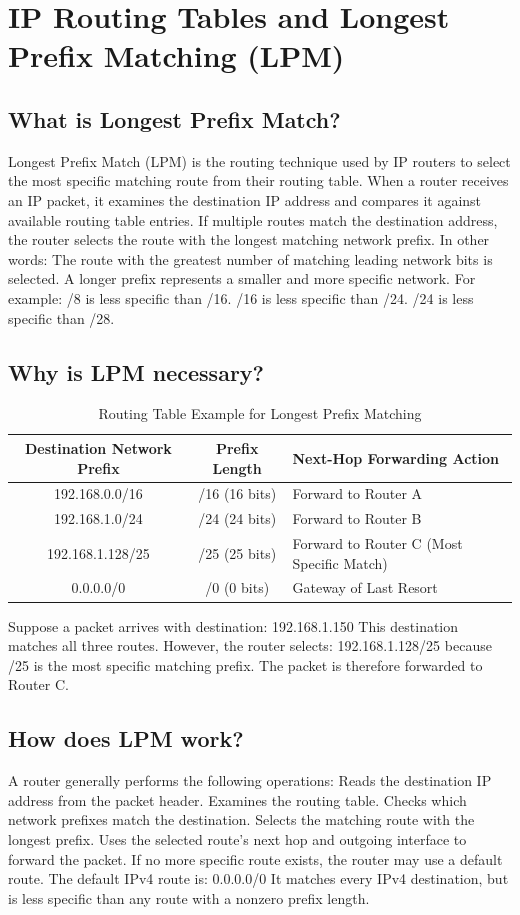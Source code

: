 \section{IP Routing Tables and Longest Prefix Matching (LPM)}

\subsection{What is Longest Prefix Match?}
Longest Prefix Match (LPM) is the routing technique used by IP routers to select the most specific matching route from their routing table.
When a router receives an IP packet, it examines the destination IP address and compares it against available routing table entries.
If multiple routes match the destination address, the router selects the route with the longest matching network prefix.
In other words:
The route with the greatest number of matching leading network bits is selected.
A longer prefix represents a smaller and more specific network.
For example:
/8 is less specific than /16.
/16 is less specific than /24.
/24 is less specific than /28.
\subsection{Why is LPM necessary?}
\begin{table}[htbp]
\centering
\caption{Routing Table Example for Longest Prefix Matching}
\label{tab:lpm_routing_sample}
\begin{tabularx}{0.85\textwidth}{ccX}
\toprule
\textbf{Destination Network Prefix} & \textbf{Prefix Length} & \textbf{Next-Hop Forwarding Action} \\
\midrule
192.168.0.0/16 & /16 (16 bits) & Forward to Router A \\
192.168.1.0/24 & /24 (24 bits) & Forward to Router B \\
192.168.1.128/25 & /25 (25 bits) & Forward to Router C (Most Specific Match) \\
0.0.0.0/0 & /0 (0 bits) & Gateway of Last Resort \\
\bottomrule
\end{tabularx}
\end{table}
Suppose a packet arrives with destination:
192.168.1.150
This destination matches all three routes.
However, the router selects:
192.168.1.128/25
because /25 is the most specific matching prefix.
The packet is therefore forwarded to Router C.
\subsection{How does LPM work?}
A router generally performs the following operations:
Reads the destination IP address from the packet header.
Examines the routing table.
Checks which network prefixes match the destination.
Selects the matching route with the longest prefix.
Uses the selected route's next hop and outgoing interface to forward the packet.
If no more specific route exists, the router may use a default route.
The default IPv4 route is:
0.0.0.0/0
It matches every IPv4 destination, but is less specific than any route with a nonzero prefix length.
